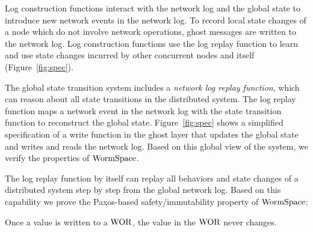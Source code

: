 Log construction functions interact with the network log and the global state to introduce new network events in the network log. To record local state changes of a node which do not involve network operations, ghost messages are written to the network log. Log construction functions use the log replay function to learn and use state changes incurred by other concurrent nodes and itself (Figure~\ref{fig:spec}).





The global state transition system includes a \textit{network log replay function}, which can reason about all state transitions in the distributed system. The log replay function maps a network event in the network log with the state transition function to reconstruct the global state. Figure~\ref{fig:spec} shows a simplified specification of a write function in the ghost layer that updates the global state and writes and reads the network log. Based on this global view of the system, we verify the properties of $\mathrm{WormSpace}$.



The log replay function by itself can replay all behaviors and state changes of a distributed system step by step from the global network log. Based on this capability we prove the Paxos-based safety/immutability property of $\mathrm{WormSpace}$:

\begin{theorem}
 Once a value is written to a $\mathrm{WOR}$, the value in the $\mathrm{WOR}$ never changes.
 \end{theorem}


